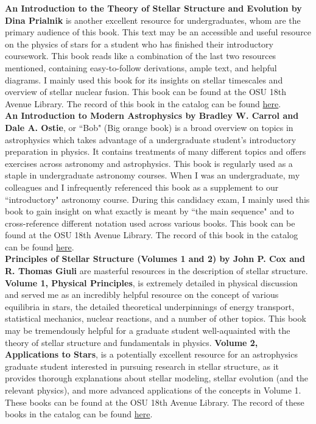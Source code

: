 \documentclass[12pt]{article}
\begin{document}
\textbf{An Introduction to the Theory of Stellar Structure and Evolution by Dina Prialnik} is another excellent resource for undergraduates, whom are the primary audience of this book. This text may be an accessible and useful resource on the physics of stars for a student who has finished their introductory coursework. This book reads like a combination of the last two resources mentioned, containing easy-to-follow derivations, ample text, and helpful diagrams. I mainly used this book for its insights on stellar timescales and overview of stellar nuclear fusion. This book can be found at the OSU 18th Avenue Library. The record of this book in the catalog can be found \href{https://library.ohio-state.edu/record=b5250814~S7}{here}. \\

\textbf{An Introduction to Modern Astrophysics by Bradley W. Carrol and Dale A. Ostie}, or ``Bob" (Big orange book) is a broad overview on topics in astrophysics which takes advantage of a undergraduate student's introductory preparation in physics. It contains treatments of many different topics and offers exercises across astronomy and astrophysics. This book is regularly used as a staple in undergraduate astronomy courses. When I was an undergraduate, my colleagues and I infrequently referenced this book as a supplement to our ``introductory" astronomy course. During this candidacy exam, I mainly used this book to gain insight on what exactly is meant by ``the main sequence" and to cross-reference different notation used across various books. This book can be found at the OSU 18th Avenue Library. The record of this book in the catalog can be found \href{https://library.ohio-state.edu/record=b4725812~S7}{here}.\\

\textbf{Principles of Stellar Structure (Volumes 1 and 2) by John P. Cox and R. Thomas Giuli} are masterful resources in the description of stellar structure. \textbf{Volume 1, Physical Principles}, is extremely detailed in physical discussion and served me as an incredibly helpful resource on the concept of various equilibria in stars, the detailed theoretical underpinnings of energy transport, statistical mechanics, nuclear reactions, and a number of other topics. This book may be tremendously helpful for a graduate student well-aquainted with the theory of stellar structure and fundamentals in physics. \textbf{Volume 2, Applications to Stars}, is a potentially excellent resource for an astrophysics graduate student interested in pursuing research in stellar structure, as it provides thorough explanations about stellar modeling, stellar evolution (and the relevant physics), and more advanced applications of the concepts in Volume 1. These books can be found at the OSU 18th Avenue Library. The record of these books in the catalog can be found \href{https://library.ohio-state.edu/record=b1748633~S7}{here}.\\
\end{document}
